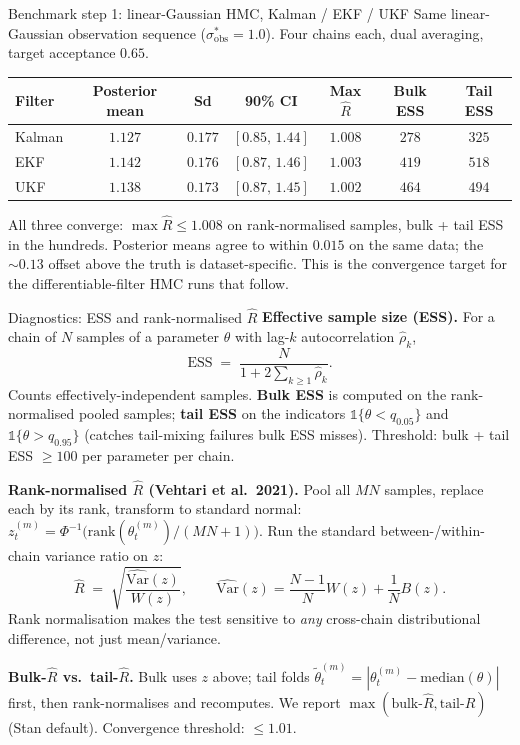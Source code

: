 \documentclass[10pt,aspectratio=169]{beamer}
\begin{document}
\begin{frame}{Benchmark step 1: linear-Gaussian HMC, Kalman / EKF / UKF}
  Same linear-Gaussian observation sequence ($\sigma_\text{obs}^* = 1.0$). Four chains each, dual averaging, target acceptance $0.65$.

  \medskip
  \begin{center}
  \footnotesize
  \begin{tabular}{l c c c c c c}
    \toprule
    Filter & Posterior mean & Sd & 90\% CI & Max $\hat R$ & Bulk ESS & Tail ESS \\
    \midrule
    Kalman & $1.127$ & $0.177$ & $[0.85,\, 1.44]$ & $1.008$ & $278$ & $325$ \\
    EKF    & $1.142$ & $0.176$ & $[0.87,\, 1.46]$ & $1.003$ & $419$ & $518$ \\
    UKF    & $1.138$ & $0.173$ & $[0.87,\, 1.45]$ & $1.002$ & $464$ & $494$ \\
    \bottomrule
  \end{tabular}
  \end{center}

  \medskip
  All three converge: $\max\hat R \le 1.008$ on rank-normalised samples, bulk + tail ESS in the hundreds. Posterior means agree to within $0.015$ on the same data; the $\sim 0.13$ offset above the truth is dataset-specific. This is the convergence target for the differentiable-filter HMC runs that follow.
\end{frame}

\begin{frame}{Diagnostics: ESS and rank-normalised $\hat R$}
  \textbf{Effective sample size (ESS).} For a chain of $N$ samples of a parameter $\theta$ with lag-$k$ autocorrelation $\hat\rho_k$,
  \[
    \mathrm{ESS} \;=\; \frac{N}{1 + 2 \sum_{k \ge 1} \hat\rho_k}.
  \]
  Counts effectively-independent samples. \textbf{Bulk ESS} is computed on the rank-normalised pooled samples; \textbf{tail ESS} on the indicators $\mathbb{1}\{\theta < q_{0.05}\}$ and $\mathbb{1}\{\theta > q_{0.95}\}$ (catches tail-mixing failures bulk ESS misses). Threshold: bulk + tail ESS $\ge 100$ per parameter per chain.

  \medskip
  \textbf{Rank-normalised $\hat R$ (Vehtari et al.\ 2021).} Pool all $MN$ samples, replace each by its rank, transform to standard normal: $z_t^{(m)} = \Phi^{-1}\!\big(\mathrm{rank}(\theta_t^{(m)})/(MN+1)\big)$. Run the standard between-/within-chain variance ratio on $z$:
  \[
    \hat R \;=\; \sqrt{\frac{\widehat{\mathrm{Var}}(z)}{W(z)}}, \qquad
    \widehat{\mathrm{Var}}(z) = \frac{N-1}{N} W(z) + \frac{1}{N} B(z).
  \]
  Rank normalisation makes the test sensitive to \emph{any} cross-chain distributional difference, not just mean/variance.

  \medskip
  \textbf{Bulk-$\hat R$ vs.\ tail-$\hat R$.} Bulk uses $z$ above; tail folds $\tilde\theta_t^{(m)} = |\theta_t^{(m)} - \mathrm{median}(\theta)|$ first, then rank-normalises and recomputes. We report $\max(\text{bulk-}\hat R, \text{tail-}\hat R)$ (Stan default). Convergence threshold: $\le 1.01$.
\end{frame}
\end{document}
